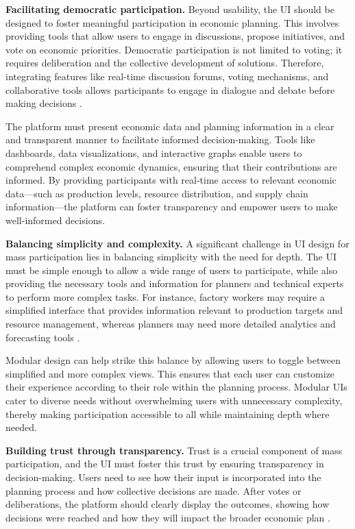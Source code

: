 \begin{refsection}
\textbf{Facilitating democratic participation.} Beyond usability, the UI should be designed to foster meaningful participation in economic planning. This involves providing tools that allow users to engage in discussions, propose initiatives, and vote on economic priorities. Democratic participation is not limited to voting; it requires deliberation and the collective development of solutions. Therefore, integrating features like real-time discussion forums, voting mechanisms, and collaborative tools allows participants to engage in dialogue and debate before making decisions \cite[pp.~98]{devine2020democracy}.

The platform must present economic data and planning information in a clear and transparent manner to facilitate informed decision-making. Tools like dashboards, data visualizations, and interactive graphs enable users to comprehend complex economic dynamics, ensuring that their contributions are informed. By providing participants with real-time access to relevant economic data—such as production levels, resource distribution, and supply chain information—the platform can foster transparency and empower users to make well-informed decisions.

\textbf{Balancing simplicity and complexity.} A significant challenge in UI design for mass participation lies in balancing simplicity with the need for depth. The UI must be simple enough to allow a wide range of users to participate, while also providing the necessary tools and information for planners and technical experts to perform more complex tasks. For instance, factory workers may require a simplified interface that provides information relevant to production targets and resource management, whereas planners may need more detailed analytics and forecasting tools \cite[pp.~123]{cockshott1993towards}.

Modular design can help strike this balance by allowing users to toggle between simplified and more complex views. This ensures that each user can customize their experience according to their role within the planning process. Modular UIs cater to diverse needs without overwhelming users with unnecessary complexity, thereby making participation accessible to all while maintaining depth where needed.

\textbf{Building trust through transparency.} Trust is a crucial component of mass participation, and the UI must foster this trust by ensuring transparency in decision-making. Users need to see how their input is incorporated into the planning process and how collective decisions are made. After votes or deliberations, the platform should clearly display the outcomes, showing how decisions were reached and how they will impact the broader economic plan \cite[pp.~98]{devine2020democracy}.


\end{refsection}
